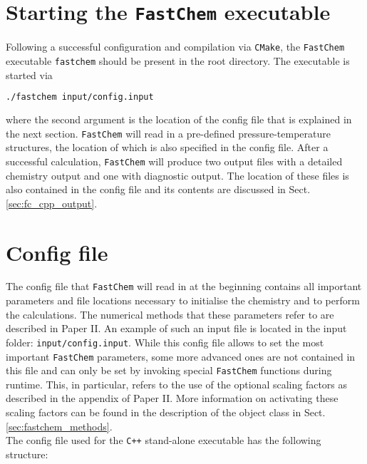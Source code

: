 \documentclass[numbers=noenddot]{aux/fcmanual}
\newcommand{\fc}{\texttt{FastChem}\xspace}
\newcommand{\cpp}{\ttt{C++}\xspace}
\newcommand{\ttt}[1]{\texttt {#1}}
\begin{document}
\section{Starting the \fc executable}

Following a successful configuration and compilation via \verb|CMake|, the \fc executable \verb|fastchem| should be present in the root directory. The executable is started via
\begin{lstlisting}[language=bash]
  ./fastchem input/config.input
\end{lstlisting}
where the second argument is the location of the config file that is explained in the next section. \fc will read in a pre-defined pressure-temperature structures, the location of which is also specified in the config file. After a successful calculation, \fc will produce two output files with a detailed chemistry output and one with diagnostic output. The location of these files is also contained in the config file and its contents are discussed in Sect. \ref{sec:fc_cpp_output}.


\section{Config file}

The config file that \fc will read in at the beginning contains all important parameters and file locations necessary to initialise the chemistry and to perform the calculations. The numerical methods that these parameters refer to are described in Paper II.
An example of such an input file is located in the input folder: \verb|input/config.input|. While this config file allows to set the most important \fc parameters, some more advanced ones are not contained in this file and can only be set by invoking special \fc functions during runtime. This, in particular, refers to the use of the optional scaling factors as described in the appendix of Paper II. More information on activating these scaling factors can be found in the description of the object class in Sect. \ref{sec:fastchem_methods}.\\

The config file used for the \cpp stand-alone executable has the following structure:

\end{document}
